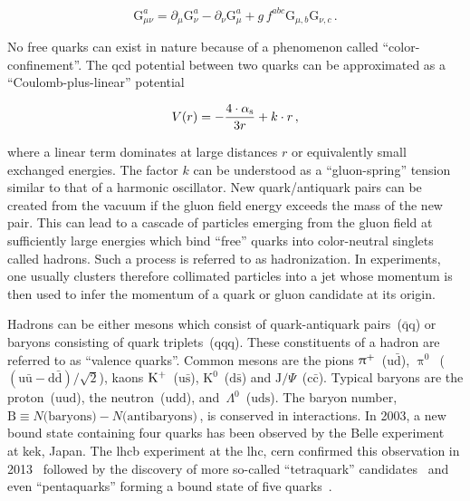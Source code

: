 \begin{equation}
\mathrm{G}_{\mu\nu}^{a}=\partial_{\mu} \mathrm{G}_\nu^{a}-\partial_{\nu} \mathrm{G}_{\mu}^{a}+g\,f^{abc}\mathrm{G}_{\mu,b}\mathrm{G}_{\nu,c}\,.
\end{equation}

No free quarks can exist in nature because of a phenomenon called ``color-confinement''. The \gls{qcd} potential between two quarks can be approximated as a ``Coulomb-plus-linear'' potential~\cite{Sumino2003173}

\begin{equation}
V(r)=-\frac{4\cdot{\alpha_\textrm{s}}}{3r}+k\cdot r\,,
\end{equation}

where a linear term dominates at large distances $r$ or equivalently small exchanged energies. The factor $k$ can be understood as a ``gluon-spring'' tension similar to that of a harmonic oscillator. New quark/antiquark pairs can be created from the vacuum if the gluon field energy exceeds the mass of the new pair. This can lead to a cascade of particles emerging from the gluon field at sufficiently large energies which bind ``free'' quarks into color-neutral singlets called hadrons. Such a process is referred to as hadronization. In experiments, one usually clusters therefore collimated particles into a jet whose momentum is then used to infer the momentum of a quark or gluon candidate at its origin.

Hadrons can be either mesons which consist of quark-antiquark pairs~($\bar{\mathrm{q}}\mathrm{q}$) or baryons consisting of quark triplets~($\mathrm{qqq}$). These constituents of a hadron are referred to as ``valence quarks''. Common mesons are the pions $\uppi^{+}$~($\mathrm{u}\bar{\mathrm{d}}$), $\uppi^{0}$~($(\mathrm{u}\bar{\mathrm{u}}-\mathrm{d}\bar{\mathrm{d}})/\sqrt{2}$), kaons $\mathrm{K}^{+}$~($\mathrm{u}\bar{\mathrm{s}}$), $\mathrm{K}^{0}$~($\mathrm{d}\bar{\mathrm{s}}$) and $\mathrm{J}/\Psi$~($\mathrm{c}\bar{\mathrm{c}}$). Typical baryons are the proton~($\mathrm{uud}$), the neutron~($\mathrm{udd}$), and~$\Lambda^{0}$~($\mathrm{uds}$). The baryon number, $\mathrm{B}\equiv N\text{(baryons)}-N\text{(antibaryons)}\,$, is conserved in interactions. In 2003, a new bound state containing four quarks has been observed by the Belle experiment~\cite{PhysRevLett.91.262001} at \gls{kek}, Japan. The \gls{lhcb} experiment at the \gls{lhc}, \gls{cern} confirmed this observation in 2013~\cite{Aaij:2013zoa} followed by the discovery of more so-called ``tetraquark'' candidates~\cite{Aaij:2014jqa,Aaij:2016iza} and even ``pentaquarks'' forming a bound state of five quarks~\cite{Aaij:2015tga}.

